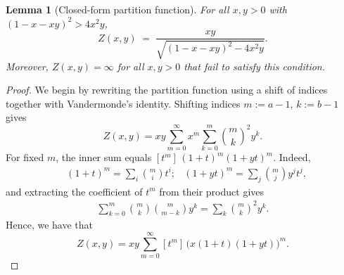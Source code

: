 \documentclass[11pt]{amsart}
\numberwithin{equation}{section}
\numberwithin{equation}{section}
\newcommand{\1}{\mathbbm{1}}
\newtheorem{lemma}[theorem]{Lemma}
\theoremstyle{definition}
\begin{document}
\begin{lemma}[Closed-form partition function]\label{lem:partition-closed-form}
    For all $x,y>0$ with $(1-x-xy)^2>4x^2 y$,
    \begin{equation}\label{eq:partition-closed-form}
        Z(x,y)\;=\;\frac{xy}{\sqrt{(1-x-xy)^{2}-4x^{2}y}}.
    \end{equation}
    Moreover, $Z(x,y) = \infty$ for all $x, y > 0$ that fail to satisfy this condition.
\end{lemma}

\begin{proof}
We begin by rewriting the partition function using a shift of indices together with Vandermonde's identity. Shifting indices $m:=a-1$, $k:=b-1$ gives
\begin{equation}\label{eq:vandermonde-rewrite}
Z(x,y)=xy\sum_{m=0}^{\infty}x^{m}\sum_{k=0}^{m}\binom{m}{k}^{2}y^{k}.
\end{equation}
For fixed $m$, the inner sum equals $[t^{m}]\,(1+t)^{m}(1+yt)^{m}$. Indeed,
\begin{align*}
    & (1+t)^m=\sum_{i}\binom{m}{i}t^i;
    & (1+yt)^m=\sum_{j}\binom{m}{j}y^j t^j,
\end{align*}
and extracting the coefficient of $t^m$ from their product gives
\begin{align*}
    \sum_{k=0}^m \binom{m}{k}\binom{m}{m-k}y^k = \sum_{k}\binom{m}{k}^2 y^k.
\end{align*}
Hence, we have that
\begin{equation}\label{eq:diagonal-sum}
Z(x,y)=xy\sum_{m=0}^{\infty}[t^{m}]\,\bigl(x(1+t)(1+yt)\bigr)^{m}.
\end{equation}


\end{proof}
\end{document}
